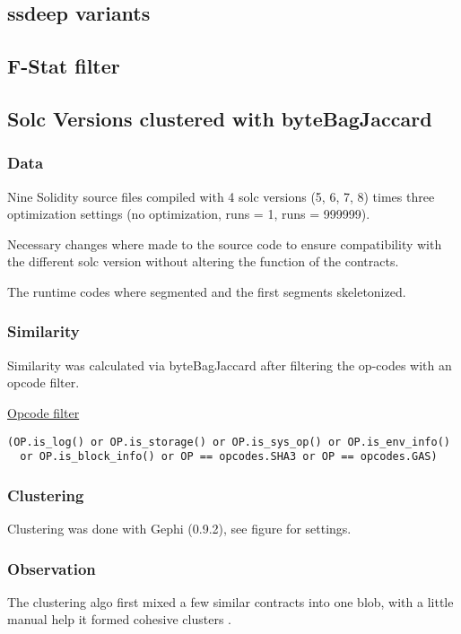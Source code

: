 \documentclass[../main.tex]{subfiles}
\begin{document}

\subsection{ssdeep variants}

\subsection{F-Stat filter}


\subsection{Solc Versions clustered with byteBagJaccard}

\subsubsection{Data}

Nine Solidity source files compiled with 4 solc versions (5, 6, 7, 8) times three optimization
settings (no optimization, runs = 1, runs = 999999).

Necessary changes where made to the source code to ensure compatibility with the different solc
version without altering the function of the contracts.

The runtime codes where segmented and the first segments skeletonized.

\subsubsection{Similarity}
Similarity was calculated via byteBagJaccard after filtering the op-codes with an opcode filter.

\underline{Opcode filter}
\begin{lstlisting}[style=pymd]
(OP.is_log() or OP.is_storage() or OP.is_sys_op() or OP.is_env_info()
  or OP.is_block_info() or OP == opcodes.SHA3 or OP == opcodes.GAS)
\end{lstlisting}

\subsubsection{Clustering}
Clustering was done with Gephi (0.9.2), see figure for settings.

\subsubsection{Observation}
The clustering algo first mixed a few similar contracts into one blob, with a little manual help
it formed cohesive clusters .
\end{document}
